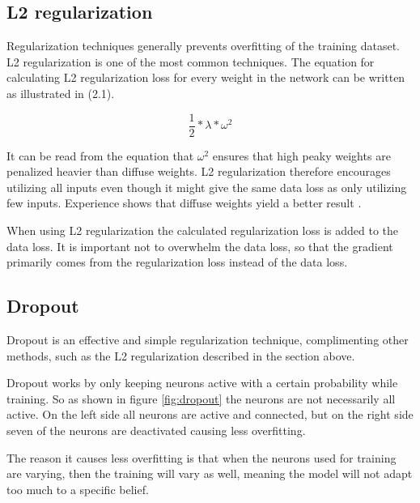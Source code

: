 \subsection{L2 regularization}
Regularization techniques generally prevents overfitting of the training dataset. L2 regularization is one of the most common techniques. The equation for calculating L2 regularization loss for every weight in the network can be written as illustrated in (2.1). 

\begin{equation}
\dfrac{1}{2} * \lambda * \omega^2
\end{equation}

It can be read from the equation that $\omega^2$ ensures that high peaky weights are penalized heavier than diffuse weights. L2 regularization therefore encourages utilizing all inputs even though it might give the same data loss as only utilizing few inputs. Experience shows that diffuse weights yield a better result \citep{LC_cs231n}.

When using L2 regularization the calculated regularization loss is added to the data loss. It is important not to overwhelm the data loss, so that the gradient primarily comes from the regularization loss instead of the data loss.



\subsection{Dropout}
Dropout is an effective and simple regularization technique, complimenting other methods, such as the L2 regularization described in the section above. 

Dropout works by only keeping neurons active with a certain probability while training. So as shown in figure \ref{fig:dropout} the neurons are not necessarily all active. On the left side all neurons are active and connected, but on the right side seven of the neurons are deactivated causing less overfitting.  


The reason it causes less overfitting is that when the neurons used for training are varying, then the training will vary as well, meaning the model will not adapt too much to a specific belief. 



